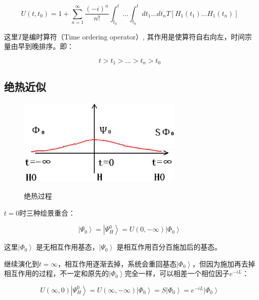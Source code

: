 \begin{equation}
U(t,t_0) =1 + \sum\limits_{n=1}^{\infty} \frac{(-i)^n}{n!} \int_{t_0}^t ... \int_{t_0}^t  d t_1 ... d t_n T \left[ H_1 (t_1) ... H_1 (t_n)  \right] 
\end{equation}

这里$T$是编时算符（Time ordering operator）, 其作用是使算符自右向左，时间宗量由早到晚排序。即：

\begin{equation*}
t > t_1 > ... > t_n > t_0
\end{equation*}

\subsection{绝热近似}

\begin{figure}[htbp]
\begin{center}
\includegraphics[width=8cm]{Zero/juerejinsi.ps}\\
\caption{绝热过程}
\label{adiabatic process}
\end{center}
\end{figure}

$t =0$时三种绘景重合：

\begin{equation}
\left| \Psi_0 \right\rangle = \left| \Psi_H^0 \right\rangle = U (0, -\infty) \left| \Phi_0 \right\rangle
\end{equation}

这里$\left| \Phi_0 \right\rangle$ 是无相互作用基态，$\left| \Psi_0 \right\rangle$ 是相互作用百分百施加后的基态。

继续演化到$t = \infty$，相互作用逐渐去掉，系统会重回基态$\left| \Phi_0 \right\rangle$，但因为施加再去掉相互作用的过程，不一定和原先的$\left| \Phi_0 \right\rangle$完全一样，可以相差一个相位因子$e^{-iL}$：

\begin{equation}
U(\infty, 0) \left| \Psi_H^0 \right\rangle = U(\infty, -\infty) \left| \Phi_0 \right\rangle = S \left| \Phi_0 \right\rangle = e^{-iL} \left| \Phi_0 \right\rangle 
\end{equation}

